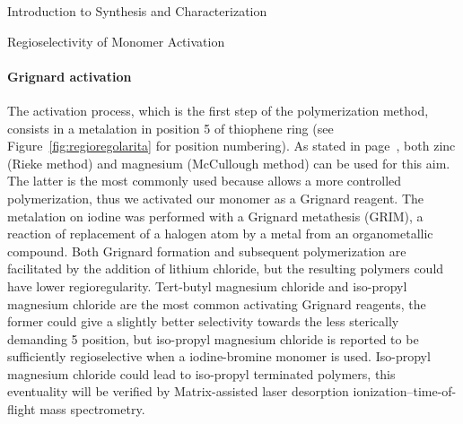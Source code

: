\begin{section}{Introduction to Synthesis and Characterization}
\begin{subsection}{Regioselectivity of Monomer Activation}
\paragraph{Grignard activation} The activation process, which is the first step of the polymerization method, consists in a metalation in position 5 of thiophene ring (see Figure~\ref{fig:regioregolarita} for position numbering). As stated in page~\pageref{intro-polimerizzazione}, both zinc
(Rieke method) and magnesium (McCullough method) can be used for this aim. The latter is the most commonly used because allows a more controlled polymerization, thus we activated our monomer as a Grignard reagent. 
The metalation on iodine was performed with a Grignard metathesis 
(\acrshort{GRIM}), a reaction of replacement of a halogen atom by a metal from an organometallic compound. 
Both Grignard formation and subsequent polymerization are facilitated by the addition of lithium chloride, but the resulting polymers could have lower regioregularity. 
Tert-butyl magnesium chloride and iso-propyl magnesium chloride are the most common activating Grignard reagents, the former could give a slightly better selectivity towards the less sterically demanding 5 position, but iso-propyl magnesium chloride is reported to be sufficiently regioselective when a iodine-bromine monomer is used. 
Iso-propyl magnesium chloride could lead to iso-propyl terminated polymers, this eventuality will be verified by Matrix-assisted laser desorption ionization--time-of-flight mass spectrometry.


\end{subsection}
\end{section}
